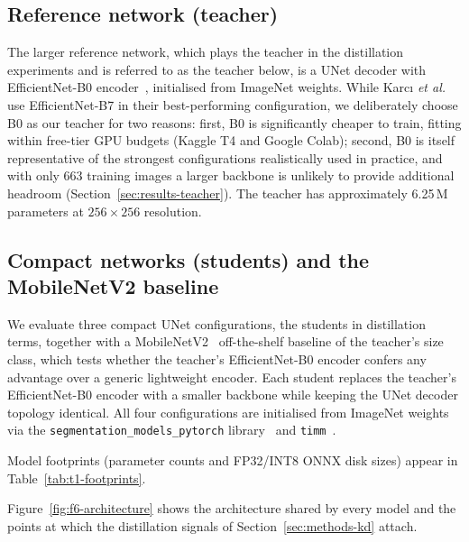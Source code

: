 \subsection{Reference network (teacher)}
\label{sec:methods-teacher}

The larger reference network, which plays the teacher in the distillation experiments and is referred to as the teacher below, is a UNet decoder with EfficientNet-B0 encoder~\cite{tan2019efficientnet}, initialised from ImageNet weights. While Karc{\i} \emph{et al.}~\cite{karci2026deep} use EfficientNet-B7 in their best-performing configuration, we deliberately choose B0 as our teacher for two reasons: first, B0 is significantly cheaper to train, fitting within free-tier GPU budgets (Kaggle T4 and Google Colab); second, B0 is itself representative of the strongest configurations realistically used in practice, and with only 663 training images a larger backbone is unlikely to provide additional headroom (Section~\ref{sec:results-teacher}). The teacher has approximately 6.25\,M parameters at $256{\times}256$ resolution.

\subsection{Compact networks (students) and the MobileNetV2 baseline}
\label{sec:methods-students}

We evaluate three compact UNet configurations, the students in distillation terms, together with a MobileNetV2~\cite{sandler2018mobilenetv2} off-the-shelf baseline of the teacher's size class, which tests whether the teacher's EfficientNet-B0 encoder confers any advantage over a generic lightweight encoder. Each student replaces the teacher's EfficientNet-B0 encoder with a smaller backbone while keeping the UNet decoder topology identical. All four configurations are initialised from ImageNet weights via the \texttt{segmentation\_models\_pytorch} library~\cite{iakubovskii2019smp} and \texttt{timm}~\cite{wightman2019timm}.

Model footprints (parameter counts and FP32/INT8 ONNX disk sizes) appear in Table~\ref{tab:t1-footprints}.

Figure~\ref{fig:f6-architecture} shows the architecture shared by every model and the points at which the distillation signals of Section~\ref{sec:methods-kd} attach.

